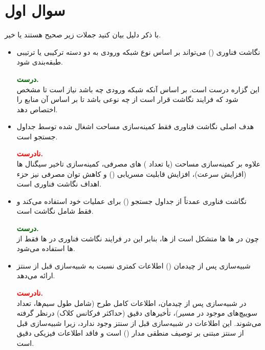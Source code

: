 \section{سوال اول}





با ذکر دلیل بیان کنید جملات زیر صحیح هستند یا خیر.
\begin{itemize}
	\item نگاشت فناوری () می‌تواند بر اساس نوع شبکه ورودی به دو دسته ترکیبی یا ترتیبی طبقه‌بندی شود.
	
	\begin{qsolve}
		\textbf{\textcolor{darkgreen}{درست.}}\\
		این گزاره درست است. بر اساس آنکه شبکه ورودی چه باشد نیاز است تا مشخص شود که فرایند نگاشت قرار است از چه نوعی باشد تا بر اساس آن منابع را اختصاص دهد.
	\end{qsolve}
	
	
	\item هدف اصلی نگاشت فناوری  فقط کمینه‌سازی مساحت اشغال شده توسط جداول جستجو است.
	\begin{qsolve}
		\textbf{\textcolor{red}{نادرست.}}\\
		علاوه بر کمینه‌سازی مساحت (یا تعداد ) های مصرفی، کمینه‌سازی تاخیر سیگنال ها (افزایش سرعت)، افزایش قابلیت مسریابی () و کاهش توان مصرفی نیز حزء اهداف نگاشت فناوری است.
	\end{qsolve}
	
	
	
	\item نگاشت فناوری  عمدتاً از جداول جستجو () برای عملیات خود استفاده می‌کند و فقط شامل نگاشت  است.
	\begin{qsolve}
		\textbf{\textcolor{darkgreen}{درست.}}\\
		چون در ‌ها ها متشکل است از ها، بنابر این در فرایند نگاشت فناوری در ها فقط از ها استفاده می‌شود.
	\end{qsolve}
	
	
	
	
	\item شبیه‌سازی پس از چیدمان () اطلاعات کمتری نسبت به شبیه‌سازی قبل از سنتز ارائه می‌دهد.
	\begin{qsolve}
		\textbf{\textcolor{red}{نادرست.}}\\
		در شبیه‌سازی پس از چیدمان، اطلاعات کامل طرح (شامل طول سیم‌ها، تعداد سوییچ‌های موجود در مسیر)، تأخیرهای دقیق (حداکثر فرکانس کلاک) درنظر گرفته می‌شوند. این اطلاعات در شبیه‌سازی قبل از سنتز وجود ندارد، زیرا شبیه‌سازی قبل از سنتز مبتنی بر توصیف منطقی مدار () است و فاقد اطلاعات فیزیکی دقیق است.
	\end{qsolve}
	

\end{itemize}
